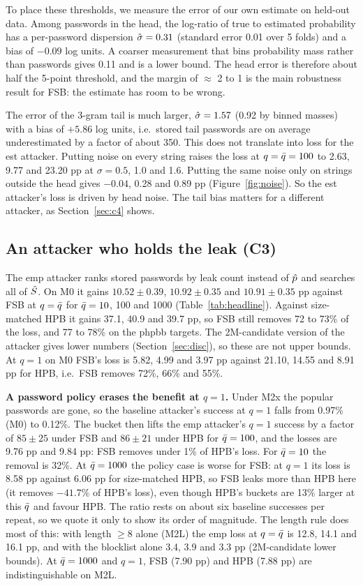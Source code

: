 To place these thresholds, we measure the error of our own estimate on held-out data. Among passwords in the head, the log-ratio of true to estimated probability has a per-password dispersion $\hat\sigma=0.31$ (standard error 0.01 over 5 folds) and a bias of $-0.09$ log units. A coarser measurement that bins probability mass rather than passwords gives 0.11 and is a lower bound. The head error is therefore about half the 5-point threshold, and the margin of $\approx$ 2 to 1 is the main robustness result for FSB: the estimate has room to be wrong.

The error of the 3-gram tail is much larger, $\hat\sigma=1.57$ (0.92 by binned masses) with a bias of $+5.86$ log units, i.e.\ stored tail passwords are on average underestimated by a factor of about 350. This does not translate into loss for the est attacker. Putting noise on every string raises the loss at $q=\bar q=100$ to 2.63, 9.77 and 23.20 pp at $\sigma=0.5$, 1.0 and 1.6. Putting the same noise only on strings outside the head gives $-0.04$, 0.28 and 0.89 pp (Figure~\ref{fig:noise}). So the est attacker's loss is driven by head noise. The tail bias matters for a different attacker, as Section~\ref{sec:c4} shows.

\subsection{An attacker who holds the leak (C3)}\label{sec:c3}


The emp attacker ranks stored passwords by leak count instead of $\hat p$ and searches all of $\tilde S$. On M0 it gains $10.52\pm0.39$, $10.92\pm0.35$ and $10.91\pm0.35$ pp against FSB at $q=\bar q$ for $\bar q=10$, 100 and 1000 (Table~\ref{tab:headline}). Against size-matched HPB it gains 37.1, 40.9 and 39.7 pp, so FSB still removes 72 to 73\% of the loss, and 77 to 78\% on the phpbb targets. The 2M-candidate version of the attacker gives lower numbers (Section~\ref{sec:disc}), so these are not upper bounds. At $q=1$ on M0 FSB's loss is 5.82, 4.99 and 3.97 pp against 21.10, 14.55 and 8.91 pp for HPB, i.e.\ FSB removes 72\%, 66\% and 55\%.

\textbf{A password policy erases the benefit at $q=1$.} Under M2x the popular passwords are gone, so the baseline attacker's success at $q=1$ falls from 0.97\% (M0) to 0.12\%. The bucket then lifts the emp attacker's $q=1$ success by a factor of $85\pm25$ under FSB and $86\pm21$ under HPB for $\bar q=100$, and the losses are 9.76 pp and 9.84 pp: FSB removes under 1\% of HPB's loss. For $\bar q=10$ the removal is 32\%. At $\bar q=1000$ the policy case is worse for FSB: at $q=1$ its loss is 8.58 pp against 6.06 pp for size-matched HPB, so FSB leaks more than HPB here (it removes $-41.7$\% of HPB's loss), even though HPB's buckets are 13\% larger at this $\bar q$ and favour HPB. The ratio rests on about six baseline successes per repeat, so we quote it only to show its order of magnitude. The length rule does most of this: with length $\geq 8$ alone (M2L) the emp loss at $q=\bar q$ is 12.8, 14.1 and 16.1 pp, and with the blocklist alone 3.4, 3.9 and 3.3 pp (2M-candidate lower bounds). At $\bar q=1000$ and $q=1$, FSB (7.90 pp) and HPB (7.88 pp) are indistinguishable on M2L.

